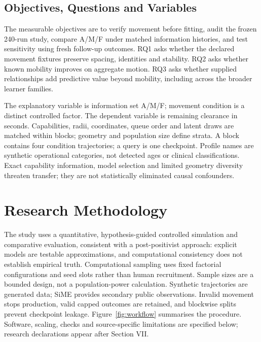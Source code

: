 \subsection{Objectives, Questions and Variables}
The measurable objectives are to verify movement before fitting, audit the frozen 240-run study, compare A/M/F under matched information histories, and test sensitivity using fresh follow-up outcomes. RQ1 asks whether the declared movement fixtures preserve spacing, identities and stability. RQ2 asks whether known mobility improves on aggregate motion. RQ3 asks whether supplied relationships add predictive value beyond mobility, including across the broader learner families.

The explanatory variable is information set A/M/F; movement condition is a distinct controlled factor. The dependent variable is remaining clearance in seconds. Capabilities, radii, coordinates, queue order and latent draws are matched within blocks; geometry and population size define strata. A block contains four condition trajectories; a query is one checkpoint. Profile names are synthetic operational categories, not detected ages or clinical classifications. Exact capability information, model selection and limited geometry diversity threaten transfer; they are not statistically eliminated causal confounders.

\section{Research Methodology}
The study uses a quantitative, hypothesis-guided controlled simulation and comparative evaluation, consistent with a post-positivist approach: explicit models are testable approximations, and computational consistency does not establish empirical truth. Computational sampling uses fixed factorial configurations and seed slots rather than human recruitment. Sample sizes are a bounded design, not a population-power calculation. Synthetic trajectories are generated data; SiME provides secondary public observations. Invalid movement stops production, valid capped outcomes are retained, and blockwise splits prevent checkpoint leakage. Figure~\ref{fig:workflow} summarises the procedure. Software, scaling, checks and source-specific limitations are specified below; research declarations appear after Section VII.

